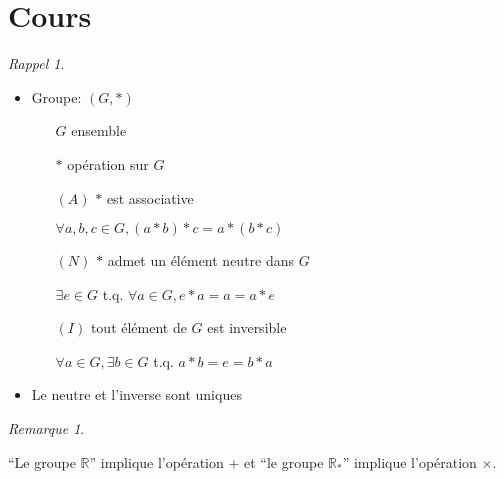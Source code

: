 \documentclass{report}
\newcounter{cours}
\newcommand*{\cours}{\section*{Cours \thecours}\stepcounter{cours}}
\theoremstyle{definition}
\theoremstyle{remark}
\newtheorem*{rema}{Remarque}
\newtheorem*{rappel}{Rappel}
\begin{document}
	\cours
	\begin{rappel}
		~

		\begin{itemize}[noitemsep]
			\item Groupe: $(G,*)$
			\begin{itemize}
				\item[$G$] ensemble
				\item[$*$] op\'eration sur $G$
				\item[$(A)$] $*$ est associative

				$\forall a,b,c \in G, (a*b)*c=a*(b*c)$
				\item[$(N)$] $*$ admet un \'el\'ement neutre dans $G$

				$\exists e \in G$ t.q. $\forall a \in G, e*a=a=a*e$
				\item[$(I)$] tout \'el\'ement de $G$ est inversible

				$\forall a \in G, \exists b \in G$ t.q. $a*b=e=b*a$
			\end{itemize}
			\item Le neutre et l'inverse sont uniques
		\end{itemize}
	\end{rappel}

	\begin{rema}
		~

		``Le groupe $\mathbb{R}$'' implique l'op\'eration $+$ et ``le groupe $\mathbb{R}_*$'' implique l'op\'eration $\times$.
	\end{rema}
\end{document}
